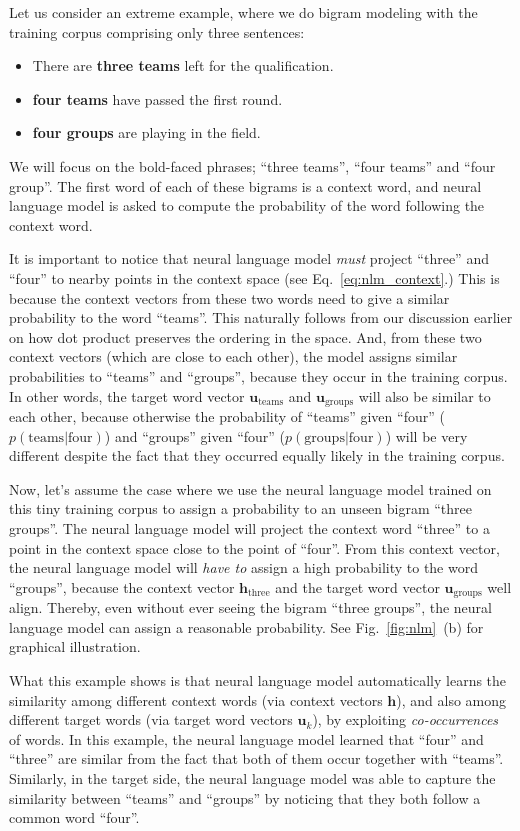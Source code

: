 \documentclass{report}
\newcommand{\vect}[1]{\mathbf{#1}}
\newcommand{\vh}[0]{\vect{h}}
\newcommand{\vu}[0]{\vect{u}}
\begin{document}
Let us consider an extreme example, where we do bigram modeling with the
training corpus comprising only three sentences:
\begin{itemize}
    \itemsep 0em
    \item There are {\bf three teams} left for the qualification.
    \item {\bf four teams} have passed the first round.
    \item {\bf four groups} are playing in the field.
\end{itemize}
We will focus on the bold-faced phrases; ``three teams'', ``four teams'' and
``four group''. The first word of each of these bigrams is a context word, and
neural language model is asked to compute the probability of the word following
the context word.

It is important to notice that neural language model {\em must} project
``three'' and ``four'' to nearby points in the context space (see
Eq.~\eqref{eq:nlm_context}.) This is because the context vectors from these two
words need to give a similar probability to the word ``teams''. This naturally
follows from our discussion earlier on how dot product preserves the ordering in
the space. And, from these two context vectors (which are close to each other),
the model assigns similar probabilities to ``teams'' and ``groups'', because
they occur in the training corpus. In other words, the target word vector
$\vu_{\text{teams}}$ and $\vu_{\text{groups}}$ will also be similar to each
other, because otherwise the probability of ``teams'' given ``four''
($p(\text{teams} | \text{four})$) and
``groups'' given ``four'' ($p(\text{groups} | \text{four})$) will be very
different despite the fact that they occurred equally likely in the training
corpus.

Now, let's assume the case where we use the neural language model trained on
this tiny training corpus to assign a probability to an unseen bigram ``three
groups''. The neural language model will project the context word ``three'' to a
point in the context space close to the point of ``four''. From this context
vector, the neural language model will {\em have to} assign a high probability
to the word ``groups'', because the context vector $\vh_{\text{three}}$ and the
target word vector $\vu_{\text{groups}}$ well align. Thereby, even without ever
seeing the bigram ``three groups'', the neural language model can assign a
reasonable probability. See Fig.~\ref{fig:nlm}~(b) for graphical
illustration.

What this example shows is that neural language model automatically learns the
similarity among different context words (via context vectors $\vh$), and also among
different target words (via target word vectors $\vu_k$), by exploiting {\em
co-occurrences} of words. In this example, the neural language model learned
that ``four'' and ``three'' are similar from the fact that both of them occur
together with ``teams''. Similarly, in the target side, the neural language
model was able to capture the similarity between ``teams'' and ``groups'' by
noticing that they both follow a common word ``four''.
\end{document}
